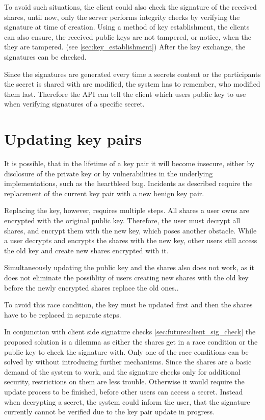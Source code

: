 To avoid such situations, the client could also check the signature of the
received shares, until now, only the server performs integrity checks by
verifying the signature at time of creation. Using a method of key
establishment, the clients can also ensure, the received public keys are not
tampered, or notice, when the they are tampered. (see
\ref{sec:key_establishment}) After the key exchange, the signatures can be
checked.

Since the signatures are generated every time a secrets content or the
participants the secret is shared with are modified, the system has to
remember, who modified them last. Therefore the API can tell the client which
users public key to use when verifying signatures of a specific secret.

\section{Updating key pairs}
\label{sec:update_key_pair}

It is possible, that in the lifetime of a key pair it will become insecure,
either by disclosure of the private key or by vulnerabilities in the underlying
implementations, such as the heartbleed bug. Incidents as described require
the replacement of the current key pair with a new benign key pair.

Replacing the key, however, requires multiple steps. All shares a user owns are
encrypted with the original public key. Therefore, the user must decrypt all
shares, and encrypt them with the new key, which poses another obstacle. While
a user decrypts and encrypts the shares with the new key, other users still
access the old key and create new shares encrypted with it.

Simultaneously updating the public key and the shares also does not work, as it
does not eliminate the possiblity of users creating new shares with the old key
before the newly encrypted shares replace the old ones..

To avoid this race condition, the key must be updated first and then the shares
have to be replaced in separate steps.

In conjunction with client side signature checks
\ref{sec:future:client_sig_check} the proposed solution is a dilemma as either
the shares get in a race condition or the public key to check the signature
with. Only one of the race conditions can be solved by without introducing
further mechanisms. Since the shares are a basic demand of the system to work,
and the signature checks only for additional security, restrictions on them are
less trouble. Otherwise it would require the update process to be finished,
before other users can access a secret. Instead when decrypting a secret, the
system could inform the user, that the signature currently cannot be verified
due to the key pair update in progress.

